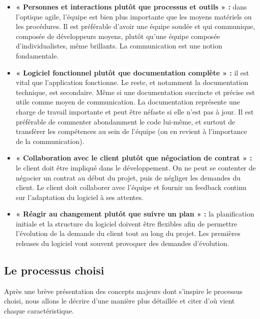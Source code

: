 \begin{itemize}
        \item [\textbullet] \textbf{« Personnes et interactions plutôt que
            processus et outils » :} dans l’optique agile, l’équipe est bien
            plus importante que les moyens matériels ou les procédures. Il est
            préférable d’avoir une équipe soudée et qui communique, composée de
            développeurs moyens, plutôt qu’une équipe composée
            d’individualistes, même brillants. La communication est une notion
            fondamentale.
        \item [\textbullet] \textbf{« Logiciel fonctionnel plutôt que
            documentation complète » :} il est vital que l’application
            fonctionne. Le reste, et notamment la documentation technique, est
            secondaire. Même si une documentation succincte et précise est utile
            comme moyen de communication. La documentation représente une charge
            de travail importante et peut être néfaste si elle n’est pas à jour.
            Il est préférable de commenter abondamment le code lui-même, et
            surtout de transférer les compétences au sein de l’équipe (on en
            revient à l’importance de la communication).
        \item [\textbullet] \textbf{« Collaboration avec le client plutôt que
            négociation de contrat » :} le client doit être impliqué dans le
            développement. On ne peut se contenter de négocier un contrat au
            début du projet, puis de négliger les demandes du client. Le client
            doit collaborer avec l’équipe et fournir un feedback continu sur
            l’adaptation du logiciel à ses attentes.
        \item [\textbullet] \textbf{« Réagir au changement plutôt que suivre un
            plan » :} la planification initiale et la structure du logiciel
            doivent être flexibles afin de permettre l’évolution de la demande
            du client tout au long du projet. Les premières releases du logiciel
            vont souvent provoquer des demandes d’évolution. 
\end{itemize}
    
\subsection{Le processus choisi }
Après une brève présentation des concepts majeurs dont s’inspire le processus
choisi, nous allons le décrire d’une manière plus détaillée et citer d’où vient
chaque caractéristique.

